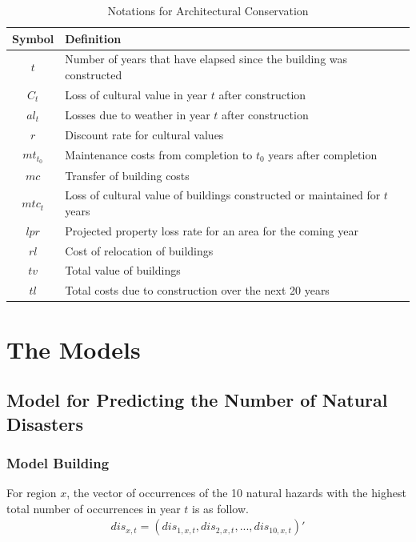 \documentclass[12pt]{article}  %
\begin{document}
\begin{table}[!htbp]
\begin{center}
\caption{Notations for Architectural Conservation}
\begin{tabular}{cl}
	\toprule
	\multicolumn{1}{m{3cm}}{\centering Symbol}
	&\multicolumn{1}{m{12cm}}{\centering Definition}\\
	\midrule
	$t$&Number of years that have elapsed since the building was constructed\\
	$C_t$&Loss of cultural value in year $t$ after construction\\
	$al_t$ &Losses due to weather in year $t$ after construction\\
        $r$ &Discount rate for cultural values\\
        $mt_{t_0}$ &Maintenance costs from completion to $t_0$ years after completion\\
        $mc$ &Transfer of building costs\\
        $mtc_t$ &Loss of cultural value of buildings constructed or maintained for $t$ years\\
        $lpr$ &Projected property loss rate for an area for the coming year\\
        $rl$ &Cost of relocation of buildings\\
        $tv$ &Total value of buildings\\
        $tl$ &Total costs due to construction over the next 20 years\\
	\bottomrule
\end{tabular}\label{notation3}
\end{center}
\end{table}



\section{The Models}
\subsection{Model for Predicting the Number of Natural Disasters}
\subsubsection{Model Building}
For region $x$, the vector of occurrences of the 10 natural hazards with the highest total number of occurrences in year $t$ is as follow.
\begin{align*}
dis_{x,t}=(dis_{1,x,t},dis_{2,x,t},...,dis_{10,x,t})'
\end{align*}
\end{document}
